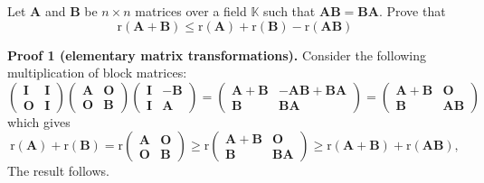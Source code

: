\documentclass[12pt, a4paper, oneside]{book}
\begin{document}
\begin{question}
    Let $\mathbf{A}$ and $\mathbf{B}$ be $n \times n$ matrices over a field $\mathbb{K}$ such that $\mathbf{A} \mathbf{B}=\mathbf{B} \mathbf{A}$. Prove that
    \[
        \mathrm{r}(\mathbf{A}+\mathbf{B}) \leq \mathrm{r}(\mathbf{A})+\mathrm{r}(\mathbf{B})-\mathrm{r}(\mathbf{A} \mathbf{B})
    \]

    \textbf{Proof 1 (elementary matrix transformations).}
    Consider the following multiplication of block matrices:
    \[
        \left(\begin{matrix}
                \mathbf{I} & \mathbf{I} \\
                \mathbf{O} & \mathbf{I}
            \end{matrix}\right)\left(\begin{matrix}
                \mathbf{A} & \mathbf{O} \\
                \mathbf{O} & \mathbf{B}
            \end{matrix}\right)\left(\begin{matrix}
                \mathbf{I} & -\mathbf{B} \\
                \mathbf{I} & \mathbf{A}
            \end{matrix}\right)=\left(\begin{matrix}
                \mathbf{A}+\mathbf{B} & -\mathbf{A} \mathbf{B}+\mathbf{B} \mathbf{A} \\
                \mathbf{B}            & \mathbf{B} \mathbf{A}
            \end{matrix}\right)=\left(\begin{matrix}
                \mathbf{A}+\mathbf{B} & \mathbf{O}            \\
                \mathbf{B}            & \mathbf{A} \mathbf{B}
            \end{matrix}\right)
    \]
    which gives
    \[
        \mathrm{r}(\mathbf{A})+\mathrm{r}(\mathbf{B})
        =
        \mathrm{r}\left(\begin{matrix}
                \mathbf{A} & \mathbf{O} \\
                \mathbf{O} & \mathbf{B}
            \end{matrix}\right)
        \geq
        \mathrm{r}\left(\begin{matrix}
                \mathbf{A}+\mathbf{B} & \mathbf{O}            \\
                \mathbf{B}            & \mathbf{B} \mathbf{A}
            \end{matrix}\right)
        \geq
        \mathrm{r}(\mathbf{A}+\mathbf{B})+\mathrm{r}(\mathbf{A} \mathbf{B}),
    \]
    The result follows.


\end{question}
\end{document}
